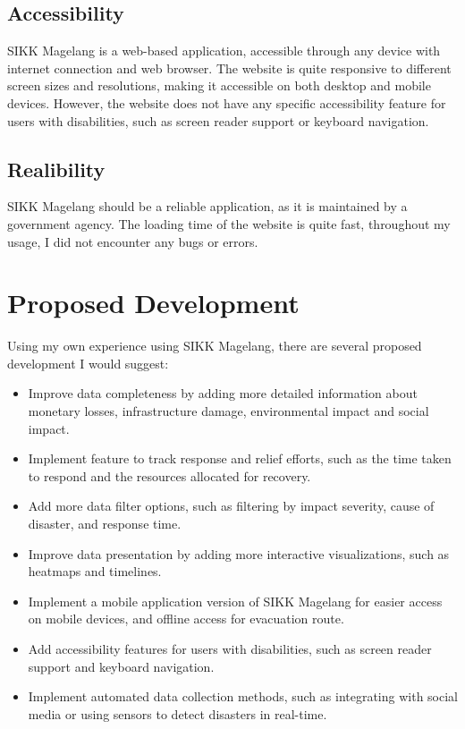 \documentclass[a4paper,12pt]{article}
\begin{document}
\subsection{Accessibility}
SIKK Magelang is a web-based application, accessible through any device with internet connection and web browser.
The website is quite responsive to different screen sizes and resolutions, making it accessible on both desktop and mobile devices.
However, the website does not have any specific accessibility feature for users with disabilities, such as screen reader support or keyboard navigation.

\subsection{Realibility}
SIKK Magelang should be a reliable application, as it is maintained by a government agency.
The loading time of the website is quite fast, throughout my usage, I did not encounter any bugs or errors.

\section{Proposed Development}
Using my own experience using SIKK Magelang, there are several proposed development I would suggest:
\begin{itemize}
    \item Improve data completeness by adding more detailed information about monetary losses, infrastructure damage, environmental impact and social impact.
    \item Implement feature to track response and relief efforts, such as the time taken to respond and the resources allocated for recovery.
    \item Add more data filter options, such as filtering by impact severity, cause of disaster, and response time.
    \item Improve data presentation by adding more interactive visualizations, such as heatmaps and timelines.
    \item Implement a mobile application version of SIKK Magelang for easier access on mobile devices, and offline access for evacuation route.
    \item Add accessibility features for users with disabilities, such as screen reader support and keyboard navigation.
    \item Implement automated data collection methods, such as integrating with social media or using sensors to detect disasters in real-time.
\end{itemize}
\end{document}
